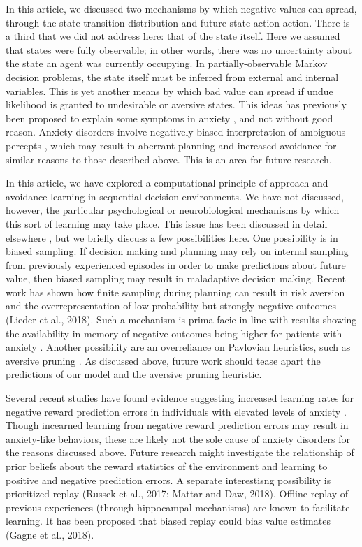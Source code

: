 \documentclass[11pt]{article} %
\begin{document}
In this article, we discussed two mechanisms by which negative values can spread, through the state transition distribution and future state-action action. There is a third that we did not address here: that of the state itself. Here we assumed that states were fully observable; in other words, there was no uncertainty about the state an agent was currently occupying. In partially-observable Markov decision problems, the state itself must be inferred from external and internal variables. This is yet another means by which bad value can spread if undue likelihood is granted to undesirable or aversive states. This ideas has previously been proposed to explain some symptoms in anxiety \citep{Paulus2012}, and not without good reason. Anxiety disorders involve negatively biased interpretation of ambiguous percepts \citep{Hartley2012}, which may result in aberrant planning and increased avoidance for similar reasons to those described above. This is an area for future research.

In this article, we have explored a computational principle of approach and avoidance learning in sequential decision environments. We have not discussed, however, the particular psychological or neurobiological mechanisms by which this sort of learning may take place. This issue has been discussed in detail elsewhere \citep{Bishop2018}, but we briefly discuss a few possibilities here. One possibility is in biased sampling. If decision making and planning may rely on internal sampling from previously experienced episodes in order to make predictions about future value, then biased sampling may result in maladaptive decision making. Recent work has shown how finite sampling during planning can result in risk aversion and the overrepresentation of low probability but strongly negative outcomes (Lieder et al., 2018). Such a mechanism is prima facie in line with results showing the availability in memory of negative outcomes being higher for patients with anxiety \citep{Borkovec1999, Miranda2007}. Another possibility are an overreliance on Pavlovian heuristics, such as aversive pruning \citep{Huys2012,Lally2017}. As discussed above, future work should tease apart the predictions of our model and the aversive pruning heuristic.

Several recent studies have found evidence suggesting increased learning rates for negative reward prediction errors in individuals with elevated levels of anxiety \citep{Harle2017, Garrett2018, Aylward2019}. Though incearned learning from negative reward prediction errors may result in anxiety-like behaviors, these are likely not the sole cause of anxiety disorders for the reasons discussed above. Future research might investigate the relationship of prior beliefs about the reward statistics of the environment and learning to positive and negative prediction errors. A separate interestisng possibility is prioritized replay (Russek et al., 2017; Mattar and Daw, 2018). Offline replay of previous experiences (through hippocampal mechanisms) are known to facilitate learning. It has been proposed that biased replay could bias value estimates (Gagne et al., 2018).
\end{document}
